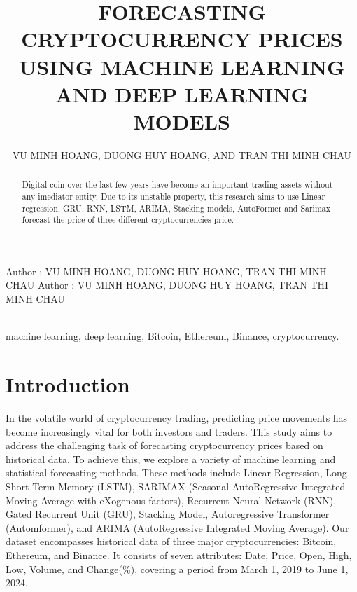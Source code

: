 \documentclass{ieeeojies}
\begin{document}
\title{FORECASTING CRYPTOCURRENCY PRICES USING MACHINE LEARNING AND DEEP LEARNING MODELS}

\author{\uppercase{VU MINH HOANG},
\uppercase{DUONG HUY HOANG, and TRAN THI MINH CHAU}}

\address[1]{Faculty of Information Systems, University of Information Technology, 21520244@gm.uit.edu.vn}
\address[1]{Faculty of Information Systems, University of Information Technology, 21522087@gm.uit.edu.vn}
\address[1]{Faculty of Information Systems, University of Information Technology, 21521888@gm.uit.edu.vn}

\markboth
{Author \headeretal: VU MINH HOANG, DUONG HUY HOANG, TRAN THI MINH CHAU}
{Author \headeretal: VU MINH HOANG, DUONG HUY HOANG, TRAN THI MINH CHAU}

\begin{abstract}
Digital coin over the last few years have become an important trading assets without any imediator entity. Due to its unstable property, this research aims to use Linear regression, GRU, RNN, LSTM, ARIMA, Stacking models, AutoFormer and Sarimax forecast the price of three different cryptocurrencies price.  
\end{abstract}
\begin{keywords}\\
    machine learning, deep learning, Bitcoin, Ethereum, Binance, cryptocurrency.
\end{keywords}




\titlepgskip=-15pt

\maketitle

\section{Introduction}
\label{sec:introduction}
In the volatile world of cryptocurrency trading, predicting price movements has become increasingly vital for both investors and traders. This study aims to address the challenging task of forecasting cryptocurrency prices based on historical data. To achieve this, we explore a variety of machine learning and statistical forecasting methods. These methods include Linear Regression, Long Short-Term Memory (LSTM), SARIMAX (Seasonal AutoRegressive Integrated Moving Average with eXogenous factors), Recurrent Neural Network (RNN), Gated Recurrent Unit (GRU), Stacking Model, Autoregressive Transformer (Automformer), and ARIMA (AutoRegressive Integrated Moving Average). Our dataset encompasses historical data of three major cryptocurrencies: Bitcoin, Ethereum, and Binance. It consists of seven attributes: Date, Price, Open, High, Low, Volume, and Change(\%), covering a period from March 1, 2019 to June 1, 2024.
\end{document}
